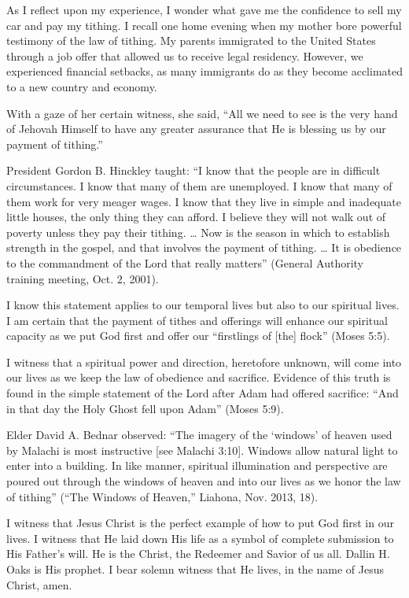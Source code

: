 \documentclass[letterpaper, 11pt]{report}
\begin{document}
As I reflect upon my experience, I wonder what gave me the confidence to sell my car and pay my tithing. I recall one home evening when my mother bore powerful testimony of the law of tithing. My parents immigrated to the United States through a job offer that allowed us to receive legal residency. However, we experienced financial setbacks, as many immigrants do as they become acclimated to a new country and economy.

With a gaze of her certain witness, she said, “All we need to see is the very hand of Jehovah Himself to have any greater assurance that He is blessing us by our payment of tithing.”

President Gordon B. Hinckley taught: “I know that the people are in difficult circumstances. I know that many of them are unemployed. I know that many of them work for very meager wages. I know that they live in simple and inadequate little houses, the only thing they can afford. I believe they will not walk out of poverty unless they pay their tithing. … Now is the season in which to establish strength in the gospel, and that involves the payment of tithing. … It is obedience to the commandment of the Lord that really matters” (General Authority training meeting, Oct. 2, 2001).

I know this statement applies to our temporal lives but also to our spiritual lives. I am certain that the payment of tithes and offerings will enhance our spiritual capacity as we put God first and offer our “firstlings of [the] flock” (Moses 5:5).

I witness that a spiritual power and direction, heretofore unknown, will come into our lives as we keep the law of obedience and sacrifice. Evidence of this truth is found in the simple statement of the Lord after Adam had offered sacrifice: “And in that day the Holy Ghost fell upon Adam” (Moses 5:9).

Elder David A. Bednar observed: “The imagery of the ‘windows’ of heaven used by Malachi is most instructive [see Malachi 3:10]. Windows allow natural light to enter into a building. In like manner, spiritual illumination and perspective are poured out through the windows of heaven and into our lives as we honor the law of tithing” (“The Windows of Heaven,” Liahona, Nov. 2013, 18).

I witness that Jesus Christ is the perfect example of how to put God first in our lives. I witness that He laid down His life as a symbol of complete submission to His Father’s will. He is the Christ, the Redeemer and Savior of us all. Dallin H. Oaks is His prophet. I bear solemn witness that He lives, in the name of Jesus Christ, amen.
\end{document}
